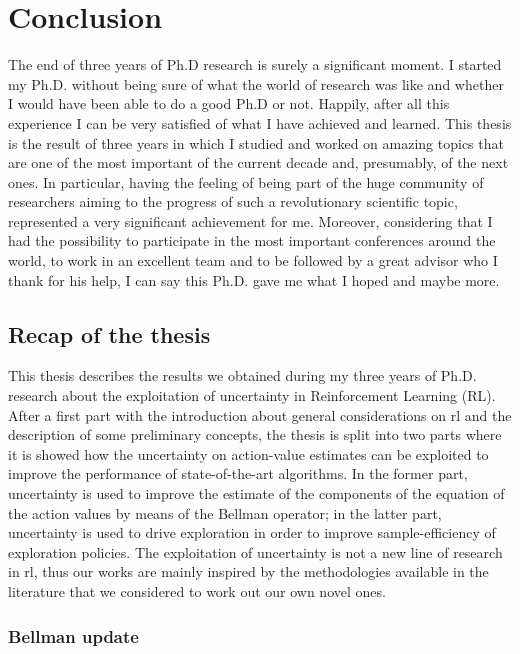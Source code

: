 \chapter{Conclusion}
The end of three years of Ph.D research is surely a significant moment. I started my Ph.D. without being sure of what the world of research was like and whether I would have been able to do a good Ph.D or not. Happily, after all this experience I can be very satisfied of what I have achieved and learned.
This thesis is the result of three years in which I studied and worked on amazing topics that are one of the most important of the current decade and, presumably, of the next ones. In particular, having the feeling of being part of the huge community of researchers aiming to the progress of such a revolutionary scientific topic, represented a very significant achievement for me. Moreover, considering that I had the possibility to participate in the most important conferences around the world, to work in an excellent team and to be followed by a great advisor who I thank for his help, I can say this Ph.D. gave me what I hoped and maybe more.

\section{Recap of the thesis}
This thesis describes the results we obtained during my three years of Ph.D. research about the exploitation of uncertainty in Reinforcement Learning (RL). After a first part with the introduction about general considerations on \gls{rl} and the description of some preliminary concepts, the thesis is split into two parts where it is showed how the uncertainty on action-value estimates can be exploited to improve the performance of state-of-the-art algorithms. In the former part, uncertainty is used to improve the estimate of the components of the equation of the action values by means of the Bellman operator; in the latter part, uncertainty is used to drive exploration in order to improve sample-efficiency of exploration policies. The exploitation of uncertainty is not a new line of research in \gls{rl}, thus our works are mainly inspired by the methodologies available in the literature that we considered to work out our own novel ones.

\subsection{Bellman update}

